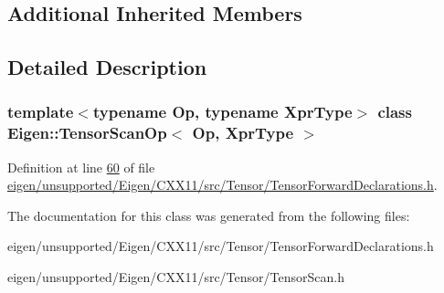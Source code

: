 \subsection*{Additional Inherited Members}


\subsection{Detailed Description}
\subsubsection*{template$<$typename Op, typename Xpr\+Type$>$\newline
class Eigen\+::\+Tensor\+Scan\+Op$<$ Op, Xpr\+Type $>$}



Definition at line \hyperlink{eigen_2unsupported_2_eigen_2_c_x_x11_2src_2_tensor_2_tensor_forward_declarations_8h_source_l00060}{60} of file \hyperlink{eigen_2unsupported_2_eigen_2_c_x_x11_2src_2_tensor_2_tensor_forward_declarations_8h_source}{eigen/unsupported/\+Eigen/\+C\+X\+X11/src/\+Tensor/\+Tensor\+Forward\+Declarations.\+h}.



The documentation for this class was generated from the following files\+:\begin{DoxyCompactItemize}
\item 
eigen/unsupported/\+Eigen/\+C\+X\+X11/src/\+Tensor/\+Tensor\+Forward\+Declarations.\+h\item 
eigen/unsupported/\+Eigen/\+C\+X\+X11/src/\+Tensor/\+Tensor\+Scan.\+h\end{DoxyCompactItemize}

